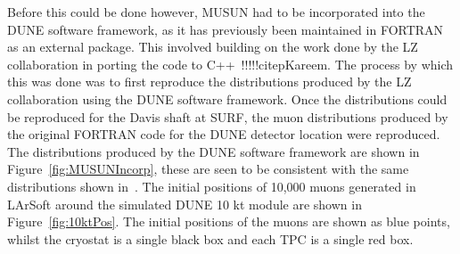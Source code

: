 Before this could be done however, MUSUN had to be incorporated into the DUNE software framework, as it has previously been maintained in FORTRAN as an external package. This involved building on the work done by the LZ collaboration in porting the code to C++~!!!!!citep{Kareem}. The process by which this was done was to first reproduce the distributions produced by the LZ collaboration using the DUNE software framework. Once the distributions could be reproduced for the Davis shaft at SURF, the muon distributions produced by the original FORTRAN code for the DUNE detector location were reproduced. The distributions produced by the DUNE software framework are shown in Figure~\ref{fig:MUSUNIncorp}, these are seen to be consistent with the same distributions shown in~\citep{MUSUNLBNE}. The initial positions of 10,000 muons generated in LArSoft around the simulated DUNE 10 kt module are shown in Figure~\ref{fig:10ktPos}. The initial positions of the muons are shown as blue points, whilst the cryostat is a single black box and each TPC is a single red box. \\


